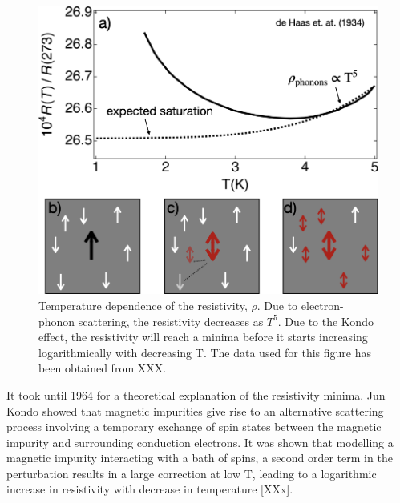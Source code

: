 \begin{figure}[!hbt]
  \begin{center}
    \includegraphics[width=1.0\textwidth]{figures/ch2/crop_PosterFiguresMaster.006.png}
    \caption[Kondo effect in bulk materials]{\label{fig:ch2/kondo_bulkmetal} 
    Temperature dependence of the resistivity, $\rho$. Due to electron-phonon scattering, the resistivity decreases as $T^5$. Due to the Kondo effect, the resistivity will reach a minima before it starts increasing logarithmically with decreasing $\mathrm{T}$. The data used for this figure has been obtained from XXX.
      }
  \end{center}
\end{figure}



It took until 1964 for a theoretical explanation of the resistivity minima. Jun Kondo showed that magnetic impurities give rise to an alternative scattering process involving a temporary exchange of spin states between the magnetic impurity and surrounding conduction electrons.  
It was shown that modelling a magnetic impurity interacting with a bath of spins, a second order term in the perturbation results in a large correction at low $\mathrm{T}$, leading to a logarithmic increase in resistivity with decrease in temperature [XXx]. 



